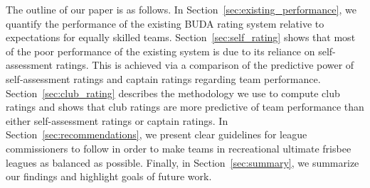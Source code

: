 The outline of our paper is as follows. In Section~\ref{sec:existing_performance}, we quantify the performance of the existing BUDA rating system relative to expectations for equally skilled teams. Section~\ref{sec:self_rating} shows that most of the poor performance of the existing system is due to its reliance on self-assessment ratings.  This is achieved via a comparison of the predictive power of self-assessment ratings and captain ratings regarding team performance.  Section~\ref{sec:club_rating} describes the methodology we use to compute club ratings and shows that club ratings are more predictive of team performance than either self-assessment ratings or captain ratings. In Section~\ref{sec:recommendations}, we present clear guidelines for league commissioners to follow in order to make teams in recreational ultimate frisbee leagues as balanced as possible. Finally, in Section~\ref{sec:summary}, we summarize our findings and highlight goals of future work.